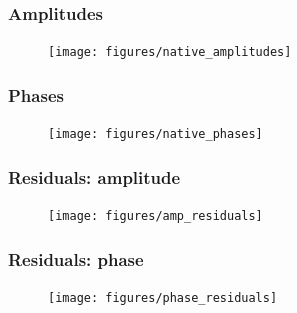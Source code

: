 \documentclass{beamer}
\begin{document}
\begin{frame}
    \frametitle{Amplitudes}
    \begin{figure}[ht]
    \centering
    \texttt{[image: figures/native\_amplitudes]}
    \label{fig:native_amplitudes}
    \end{figure}
\end{frame}

\begin{frame}
    \frametitle{Phases}
    \begin{figure}[ht]
    \centering
    \texttt{[image: figures/native\_phases]}
    \label{fig:native_phases}
    \end{figure}
\end{frame}


\begin{frame}
    \frametitle{Residuals: amplitude}
    \begin{figure}[ht]
    \centering
    \texttt{[image: figures/amp\_residuals]}
    \label{fig:amp_residuals}
    \end{figure}
\end{frame}

\begin{frame}
    \frametitle{Residuals: phase}
    \begin{figure}[ht]
    \centering
    \texttt{[image: figures/phase\_residuals]}
    \label{fig:phase_residuals}
    \end{figure}
\end{frame}
\end{document}
